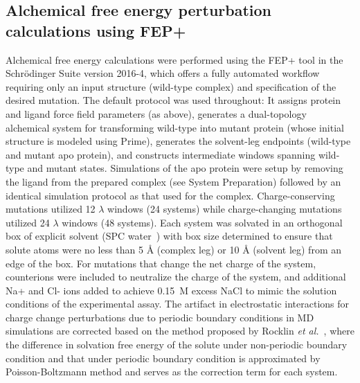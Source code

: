 \documentclass[phd,tocprelim]{cornell}
\begin{document}
\subsection{Alchemical free energy perturbation calculations using FEP+}
Alchemical free energy calculations were performed using the FEP+ tool in the Schr\"{o}dinger Suite version 2016-4, which offers a fully automated workflow requiring only an input structure (wild-type complex) and specification of the desired mutation. 
The default protocol was used throughout: It assigns protein and ligand force field parameters (as above), generates a dual-topology~\citep{Pearlman:J.Phys.Chem.:1994} alchemical system for transforming wild-type into mutant protein (whose initial structure is modeled using Prime), generates the solvent-leg endpoints (wild-type and mutant apo protein), and constructs intermediate  windows spanning wild-type and mutant states. 
Simulations of the apo protein were setup by removing the ligand from the prepared complex (see System Preparation) followed by an identical simulation protocol as that used for the complex.
Charge-conserving mutations utilized 12 $\lambda$ windows (24 systems) while charge-changing mutations utilized 24 $\lambda$  windows (48 systems). 
Each system was solvated in an orthogonal box of explicit solvent (SPC water~\citep{Berendsen:IntermolecularForces:1981}) with box size determined to ensure that solute atoms were no less than 5 {\AA} (complex leg) or 10 {\AA} (solvent leg) from an edge of the box. 
For mutations that change the net charge of the system, counterions were included to neutralize the charge of the system, and additional Na+ and Cl- ions added to achieve 0.15~M excess NaCl to mimic the solution conditions of the experimental assay. 
The artifact in electrostatic interactions for charge change perturbations due to periodic boundary conditions in MD simulations are corrected based on the method proposed by Rocklin \textit{et al.}~\citep{Rocklin:J.Chem.Phys.:2013e},
where the difference in solvation free energy of the solute under non-periodic boundary condition and that under periodic boundary condition is approximated by Poisson-Boltzmann method and serves as the correction term for each system.
\end{document}
